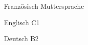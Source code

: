 

\begin{cvpairs}

  
\cvpair
    {Französisch} %
    {Muttersprache} %


\cvpair
    {Englisch} %
    {C1} %


\cvpair
    {Deutsch} %
    {B2} %

\end{cvpairs}